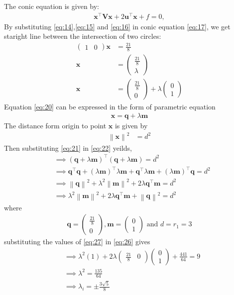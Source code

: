 \documentclass[12pt]{article}
\providecommand{\norm}[1]{\left\lVert#1\right\rVert}
\newcommand{\myvec}[1]{\ensuremath{\begin{pmatrix}#1\end{pmatrix}}}
\let\vec\mathbf
\let\vec\mathbf
\providecommand{\brak}[1]{\ensuremath{\left(#1\right)}}
\providecommand{\brak}[1]{\ensuremath{\left(#1\right)}}
\providecommand{\norm}[1]{\left\lVert#1\right\rVert}
\let\vec\mathbf
\begin{document}
The conic equation is given by:
 \begin{align}
 \vec{x}^\top\vec{V}\vec{x}+2\vec{u}^\top\vec{x}+f=0, 
  \label{eq:17}
 \end{align}
By substituting \eqref{eq:14},\eqref{eq:15} and \eqref{eq:16} in conic equation \eqref{eq:17}, we get staright line between the intersection of two circles:
\begin{align}
\myvec{1&0}\vec{x}&=\frac{21}{8}\\
\vec{x}&=\myvec{\frac{21}{8}\\\lambda}\\
\vec{x}&=\myvec{\frac{21}{8}\\0}+\lambda\myvec{0\\1}\label{eq:20}
\end{align}
		Equation \eqref{eq:20} can be expressed in the form of parametric equation
\begin{align}
	\vec{x}=\vec{q}+\lambda\vec{m}\label{eq:21}
\end{align}
The distance form origin to point $\vec{x}$ is given by
\begin{align}
	\norm{\vec{x}}^2&=d^2\label{eq:22}
\end{align}
		Then substituting \eqref{eq:21} in \eqref{eq:22} yeilds,
\begin{align}
	&\implies\brak{\vec{q}+\lambda\vec{m}}^{\top}\brak{\vec{q}+\lambda\vec{m}}=d^2\\
	&\implies \vec{q}^{\top}\vec{q}+\brak{\lambda\vec{m}}^{\top}\lambda\vec{m}+\vec{q}^{\top}\lambda\vec{m}+\brak{\lambda\vec{m}}^{\top}\vec{q}=d^2\\
	&\implies \norm{\vec{q}}^2+\lambda^2\norm{\vec{m}}^2+2\lambda\vec{q}^{\top}\vec{m}=d^2\\
	&\implies \lambda^2\norm{\vec{m}}^2+2\lambda\vec{q}^{\top}\vec{m}+\norm{\vec{q}}^2=d^2\label{eq:26}
\end{align}
where
\begin{align}
	\vec{q}=\myvec{\frac{21}{8}\\0},\vec{m}=\myvec{0\\1} \text{ and } d=r_1=3
	\label{eq:27}
\end{align}
		substituting the values of \eqref{eq:27} in \eqref{eq:26} gives
\begin{align}
	&\implies\lambda^2(1)+2\lambda\myvec{\frac{21}{8}&0}\myvec{0\\1}+\frac{441}{64}=9\\
	&\implies\lambda^2=\frac{135}{64}\\
	&\implies\lambda_i=\pm\frac{3\sqrt{5}}{8}
\end{align}
\end{document}
